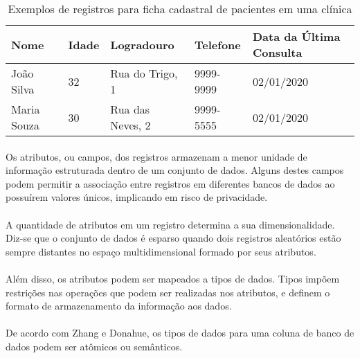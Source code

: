 \begin{table}[ht]
    \caption{Exemplos de registros para ficha cadastral de pacientes em uma clínica}
    \label{table:registros}
    \begin{center}
        \begin{tabular}{| l | l | l | l | l |}
        \hline
        Nome & Idade & Logradouro & Telefone & Data da Última Consulta \\ \hline
        João Silva & 32 & Rua do Trigo, 1 & 9999-9999 & 02/01/2020 \\ \hline
        Maria Souza & 30 & Rua das Neves, 2 & 9999-5555 & 02/01/2020 \\ \hline
        \hline
        \end{tabular}
    \end{center}
\end{table}

\paragraph{} Os atributos, ou campos, dos registros armazenam a menor unidade de informação estruturada dentro de um conjunto de dados.
Alguns destes campos podem permitir a associação entre registros em diferentes bancos de dados ao possuírem valores únicos, implicando em risco de privacidade.

\paragraph{} A quantidade de atributos em um registro determina a sua dimensionalidade. Diz-se que o conjunto de dados é esparso quando dois registros aleatórios estão sempre distantes no espaço multidimensional formado por seus atributos.

\paragraph{} Além disso, os atributos podem ser mapeados a tipos de dados. Tipos impõem restrições nas operações que podem ser realizadas nos atributos, e definem o formato de armazenamento da informação aos dados.

\paragraph{} De acordo com Zhang\cite{zhang2019sato} e Donahue\cite{donahue1979semantics}, os tipos de dados para uma coluna de banco de dados podem ser atômicos ou semânticos. 

